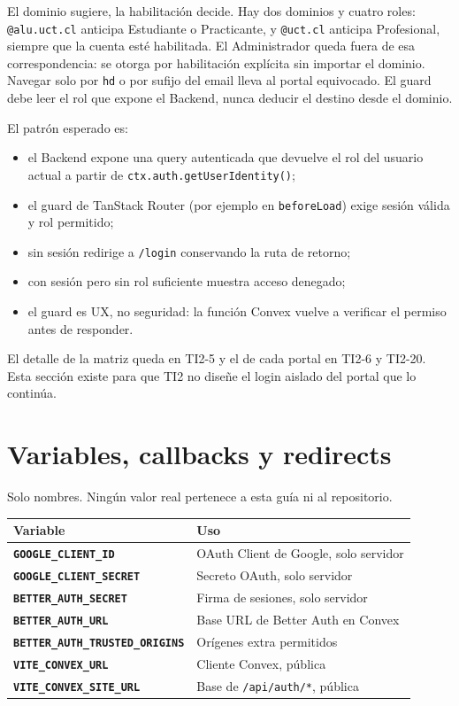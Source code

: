 \documentclass[11pt,a4paper]{article}
\begin{document}
El dominio sugiere, la habilitación decide. Hay dos dominios y cuatro roles:
\texttt{@alu.uct.cl} anticipa Estudiante o Practicante, y \texttt{@uct.cl}
anticipa Profesional, siempre que la cuenta esté habilitada. El
Administrador queda fuera de esa correspondencia: se otorga por habilitación
explícita sin importar el dominio. Navegar solo por \texttt{hd} o por sufijo
del email lleva al portal equivocado. El guard debe leer el rol que expone
el Backend, nunca deducir el destino desde el dominio.

El patrón esperado es:

\begin{itemize}
  \item el Backend expone una query autenticada que devuelve el rol del
    usuario actual a partir de \texttt{ctx.auth.getUserIdentity()};
  \item el guard de TanStack Router (por ejemplo en \texttt{beforeLoad})
    exige sesión válida y rol permitido;
  \item sin sesión redirige a \texttt{/login} conservando la ruta de retorno;
  \item con sesión pero sin rol suficiente muestra acceso denegado;
  \item el guard es UX, no seguridad: la función Convex vuelve a verificar el
    permiso antes de responder.
\end{itemize}

El detalle de la matriz queda en TI2-5 y el de cada portal en TI2-6 y TI2-20.
Esta sección existe para que TI2 no diseñe el login aislado del portal que lo
continúa.

\section{Variables, callbacks y redirects}

Solo nombres. Ningún valor real pertenece a esta guía ni al repositorio.

\begin{table}[h]
  \centering
  \begin{tabularx}{\textwidth}{>{\bfseries}l X}
    \toprule
    Variable & Uso \\
    \midrule
    \texttt{GOOGLE\_CLIENT\_ID} & OAuth Client de Google, solo servidor \\
    \texttt{GOOGLE\_CLIENT\_SECRET} & Secreto OAuth, solo servidor \\
    \texttt{BETTER\_AUTH\_SECRET} & Firma de sesiones, solo servidor \\
    \texttt{BETTER\_AUTH\_URL} & Base URL de Better Auth en Convex \\
    \texttt{BETTER\_AUTH\_TRUSTED\_ORIGINS} & Orígenes extra permitidos \\
    \texttt{VITE\_CONVEX\_URL} & Cliente Convex, pública \\
    \texttt{VITE\_CONVEX\_SITE\_URL} & Base de \texttt{/api/auth/*}, pública \\
    \bottomrule
  \end{tabularx}
\end{table}
\end{document}
